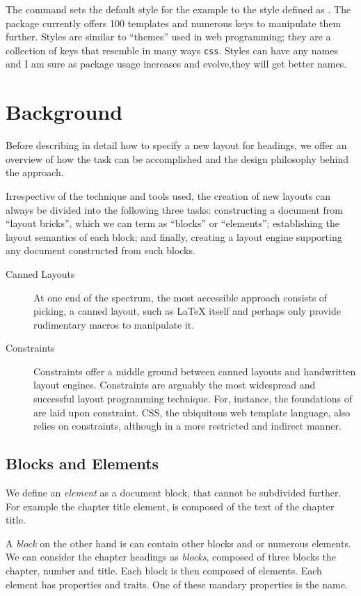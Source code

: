 The command  sets the default style for the example to the style defined as . The package currently offers  100 templates and numerous keys to manipulate them further. Styles are similar to \enquote{themes} used in web programming; they are a collection of keys that resemble in many ways \texttt{css}. Styles can have any names and I am sure as package usage increases and evolve,they will get better names. 

\section{Background}

Before describing in detail how to specify a new layout for headings, we offer an overview of how the task can be accomplished and the design philosophy behind the approach. 

Irrespective of the technique and tools used, the creation of new layouts can always be divided into the following three tasks: constructing a document from “layout bricks”, which we can term as “blocks” or “elements”; establishing the layout semantics of each block; and finally, creating a layout engine supporting any document constructed from such blocks.

\begin{description}
\item [Canned Layouts] At one end of the spectrum, the most accessible approach consists of picking, a canned layout, such as LaTeX itself and perhaps only provide rudimentary macros to manipulate it.
\item [Constraints] Constraints offer a middle ground between canned layouts and handwritten layout engines. Constraints are arguably the most widespread and successful layout programming technique. For, instance, the foundations of \tex are laid upon constraint. CSS, the ubiquitous web template language, also relies on constraints, although in a more restricted and indirect manner.
\end{description}

\subsection{Blocks and Elements}

We define an \emph{element} as a document block, that cannot be subdivided further. For example the chapter title element, is composed of the text of the chapter title. 

A \emph{block} on the other hand is can contain other blocks and or numerous elements. We can consider the chapter headings as \emph{blocks}, composed of three blocks the chapter, number and title. Each block is then composed of elements. Each element has properties and traits. One of these mandary properties is the name. 

